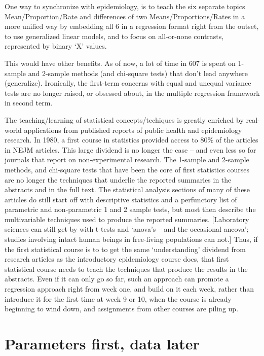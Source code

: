 \documentclass[]{book}
\begin{document}
One way to synchronize with epidemiology, is to teach the six separate topics Mean/Proportion/Rate and differences of two Means/Proportions/Rates in a more unified way by embedding all 6 in a regression format right from the outset, to use generalized linear models, and to focus on all-or-none contrasts, represented by binary `X' values.

This would have other benefits. As of now, a lot of time in 607 is spent on 1-sample and 2-sample methods (and chi-square tests) that don't lead anywhere (generalize). Ironically, the first-term concerns with equal and unequal variance tests are no longer raised, or obsessed about, in the multiple regression framework in second term.

The teaching/learning of statistical concepts/techiques is greatly enriched by real-world applications from published reports of public health and epidemiology research. In 1980, a first course in statistics provided access to 80\% of the articles in NEJM articles. This large dividend is no longer the case -- and even less so for journals that report on non-experimental research. The 1-sample and 2-sample methods, and chi-square tests that have been the core of first statistics courses are no longer the techniques that underlie the reported summaries in the abstracts and in the full text. The statistical analysis sections of
many of these articles do still start off with descriptive statistics and a perfunctory list of parametric and non-parametric 1 and 2 sample tests, but most then describe the multivariable techniques used to produce the reported summaries. {[}Laboratory sciences can still get by with t-tests and `anova's -- and the occasional ancova'; studies involving intact human beings in free-living populations can not.{]} Thus, if the first statistical course is to to get the same `understanding' dividend from research articles as the introductory epidemiology course does, that first statistical course needs to teach the techniques that produce the results in the abstracts. Even if it can only go so far, such an approach can promote a regression approach right from week one, and build on it each week, rather than introduce it for the first time at week 9 or 10, when the course is already beginning to wind down, and assignments from other courses are piling up.

\hypertarget{parameters-first-data-later}{%
\section{Parameters first, data later}\label{parameters-first-data-later}}
\end{document}
